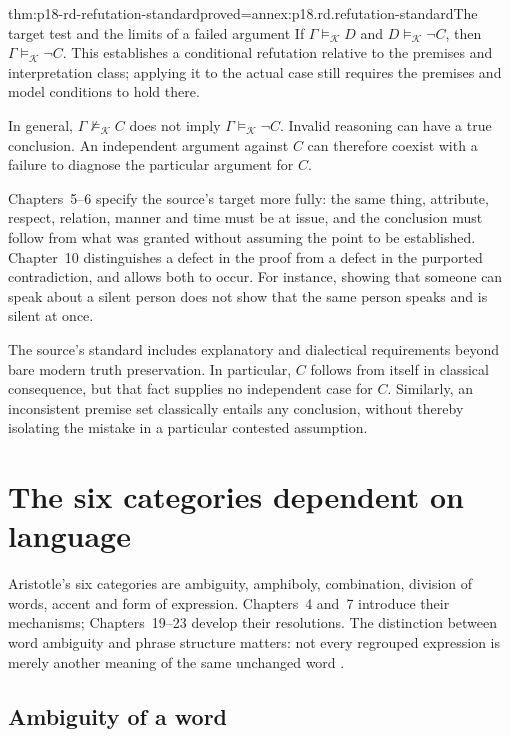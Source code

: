 \begin{hbtheorem}{thm:p18-rd-refutation-standard}{proved=annex:p18.rd.refutation-standard}{The target test and the limits of a failed argument}
If \(\Gamma\models_{\mathcal K}D\) and
\(D\models_{\mathcal K}\neg C\), then
\(\Gamma\models_{\mathcal K}\neg C\). This establishes a
conditional refutation relative to the premises and interpretation class;
applying it to the actual case still requires the premises and model
conditions to hold there.

In general, \(\Gamma\not\models_{\mathcal K}C\) does not imply
\(\Gamma\models_{\mathcal K}\neg C\). Invalid reasoning can
have a true conclusion. An independent argument against \(C\)
can therefore coexist with a failure to diagnose the particular argument
for \(C\).
\end{hbtheorem}

Chapters~5--6 specify the source's target more fully: the same thing,
attribute, respect, relation, manner and time must be at issue, and the
conclusion must follow from what was granted without assuming the point
to be established. Chapter~10 distinguishes a defect in the proof from
a defect in the purported contradiction, and allows both to occur.
For instance, showing that someone can speak about a silent person
does not show that the same person speaks and is silent at once.

The source's standard includes explanatory and dialectical requirements
beyond bare modern truth preservation. In particular, \(C\) follows
from itself in classical consequence, but that fact supplies no
independent case for \(C\). Similarly, an inconsistent premise set
classically entails any conclusion, without thereby isolating the
mistake in a particular contested assumption.

\section{The six categories dependent on language}
\label{sec:p18-rd-language}

Aristotle's six categories are ambiguity, amphiboly, combination,
division of words, accent and form of expression. Chapters~4 and~7
introduce their mechanisms; Chapters~19--23 develop their resolutions.
The distinction between word ambiguity and phrase structure matters:
not every regrouped expression is merely another meaning of the same
unchanged word \cite[chaps.~4,7,19--23]{AristotleSophisticalRefutationsPickardCambridgeMIT}.

\subsection{Ambiguity of a word}

